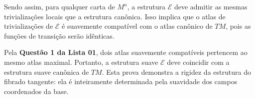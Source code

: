 {	Sendo assim, para qualquer carta de $M^n$, a estrutura $\mathcal{E}$ deve admitir as mesmas trivializações locais que a estrutura canônica. Isso implica que o atlas de trivializações de $\mathcal{E}$ é suavemente compatível com o atlas canônico de $TM$, pois as funções de transição serão idênticas.
	
	Pela \textbf{Questão 1 da Lista 01}, dois atlas suavemente compatíveis pertencem ao mesmo atlas maximal. Portanto, a estrutura suave $\mathcal{E}$ deve coincidir com a estrutura suave canônica de $TM$. Esta prova demonstra a rigidez da estrutura do fibrado tangente: ela é inteiramente determinada pela suavidade dos campos coordenados da base.
}

